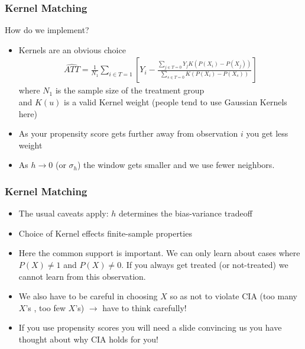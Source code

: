 \documentclass[xcolor=pdftex,dvipsnames,table,mathserif,aspectratio=169]{beamer}
\begin{document}
\begin{frame}
\frametitle{Kernel Matching}
How do we implement?
\begin{itemize}
\item Kernels are an obvious choice
\begin{eqnarray*}
\widehat{ATT} = \frac{1}{N_1} \sum_{i \in T=1} \left[Y_i - \frac{\sum_{j \in T=0} Y_j K\left(P(X_i) - P(X_j) \right) }{\sum_{s \in T=0}  K\left(P(X_i) - P(X_s) \right)}   \right]
\end{eqnarray*}
 where $N_1$ is the sample size of the treatment group \\
 and $K(u)$ is a valid Kernel weight (people tend to use Gaussian Kernels here)
\item As your propensity score gets further away from observation $i$ you get less weight
\item As $h \rightarrow 0$  (or $\sigma_h$) the window gets smaller and we use fewer neighbors.
\end{itemize}
\end{frame}


\begin{frame}
\frametitle{Kernel Matching}
\begin{itemize}
\item The usual caveats apply: $h$ determines the \alert{bias-variance} tradeoff
\item Choice of Kernel effects finite-sample properties
\item Here the \alert{common support} is important. We can only learn about cases where $P(X) \neq 1$ and $P(X) \neq 0$. If you always get treated (or not-treated) we cannot learn from this observation.
\item We also have to be careful in choosing $X$ so as not to violate CIA (too many $X$'s , too few $X$'s) $\rightarrow$ have to think carefully!
\item If you use propensity scores you will need a slide convincing us you have thought about why CIA holds for you!
\end{itemize}
\end{frame}
\end{document}
